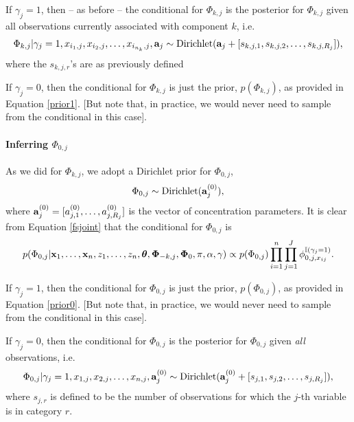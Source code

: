 \documentclass[12pt]{article}
\begin{document}
If $\gamma_j = 1$, then -- as before -- the conditional for $\Phi_{k,j}$ is the posterior for $\Phi_{k,j}$ given all observations currently associated with component $k$, i.e. 
\begin{align}
\Phi_{k,j}|\gamma_j = 1,{ x}_{i_1,j}, { x}_{i_2,j}, \ldots, { x}_{i_{n_k},j}, {\bf a}_j \sim \mbox{Dirichlet}({\bf a}_j + [s_{k,j,1}, s_{k,j,2}, \ldots, s_{k,j,R_j}]),
\end{align}
where the $s_{k,j,r}$'s are as previously defined

If $\gamma_j = 0$, then the conditional for $\Phi_{k,j}$ is just the prior, $p(\Phi_{k,j})$, as provided in Equation \eqref{prior1}.  [But note that, in practice, we would never need to sample from the conditional in this case].    


\paragraph{Inferring $\Phi_{0,j}$}
As we did for $\Phi_{k,j}$, we adopt a Dirichlet prior for 
$\Phi_{0,j}$, 
\begin{equation}
\Phi_{0,j} \sim \mbox{Dirichlet}({\bf a}_j^{(0)}),\label{prior0}
\end{equation}
where ${\bf a}_j^{(0)} = [a_{j,1}^{(0)}, \ldots, a_{j,R_j}^{(0)}]$ is the vector of concentration parameters.  
It is clear from Equation \eqref{fsjoint} that the conditional for $\Phi_{0,j}$ is
\begin{equation}
p(\Phi_{0,j}|{\bf x}_1,\ldots, {\bf x}_n,z_1, \ldots, z_n, \boldsymbol{\theta}, \boldsymbol{\Phi}_{-{k,j}}, \boldsymbol{\Phi}_0, \pi, \alpha, \gamma) \propto p(\Phi_{0,j}) \prod_{i=1}^n  \prod_{j=1}^J  \phi_{0,j,x_{ij}}^{\mathbb{I}(\gamma_j=1)}.
\end{equation}

If $\gamma_j = 1$, then the conditional for $\Phi_{0,j}$ is just the prior, $p(\Phi_{0,j})$, as provided in Equation \eqref{prior0}.  [But note that, in practice, we would never need to sample from the conditional in this case].    

If $\gamma_j = 0$, then the conditional for $\Phi_{0,j}$ is the posterior for $\Phi_{0,j}$ given {\em all} observations, i.e. 
\begin{align}
\Phi_{0,j}|\gamma_j = 1,{ x}_{1,j}, { x}_{2,j}, \ldots, { x}_{n,j}, {\bf a}_j^{(0)} \sim \mbox{Dirichlet}({\bf a}_j^{(0)} + [s_{j,1}, s_{j,2}, \ldots, s_{j,R_j}]),
\end{align}
where $s_{j,r}$ is defined to be the number of observations for which the $j$-th variable is in category $r$.
\end{document}
